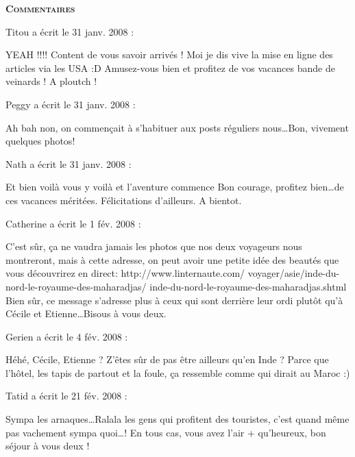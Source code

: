 \bigskip
\textbf{\textsc{Commentaires}}

\medskip
Titou a écrit le 31 janv. 2008 :
\begin{displayquote}
YEAH !!!!
Content de vous savoir arrivés ! Moi je dis vive la mise en ligne des articles via les USA :D Amusez-vous bien et profitez de vos vacances bande de veinards ! A ploutch !
\end{displayquote}

\medskip
Peggy a écrit le 31 janv. 2008 :
\begin{displayquote}
Ah bah non, on commençait à s'habituer aux posts réguliers nous\dots Bon, vivement quelques photos!
\end{displayquote}

\medskip
Nath a écrit le 31 janv. 2008 :
\begin{displayquote}
Et bien voilà vous y voilà  et l'aventure commence
Bon courage, profitez bien\dots de ces vacances méritées. Félicitations d'ailleurs.
A bientot.
\end{displayquote}

\medskip
Catherine a écrit le 1 fév. 2008 :
\begin{displayquote}
C'est sûr, ça ne vaudra jamais les photos que nos deux voyageurs nous montreront, mais à cette adresse, on peut avoir une petite idée des beautés que vous découvrirez en direct: http://www.linternaute.com/
voyager/asie/inde-du-nord-le-royaume-des-maharadjas/
inde-du-nord-le-royaume-des-maharadjas.shtml
Bien sûr, ce message s'adresse plus à ceux qui sont derrière leur ordi plutôt qu'à Cécile et Etienne\dots Bisous à vous deux.
\end{displayquote}

\medskip
Gerien a écrit le 4 fév. 2008 :
\begin{displayquote}
Héhé,
Cécile, Etienne ? Z'êtes sûr de pas être ailleurs qu'en Inde ?
Parce que l'hôtel, les tapis de partout et la foule, ça ressemble comme qui dirait au Maroc :)
\end{displayquote}

\medskip
Tatid a écrit le 21 fév. 2008 :
\begin{displayquote}
Sympa les arnaques\dots Ralala les gens qui profitent des touristes, c'est quand même pas vachement sympa quoi\dots !
En tous cas, vous avez l'air + qu'heureux, bon séjour à vous deux !
\end{displayquote}

\vfill
